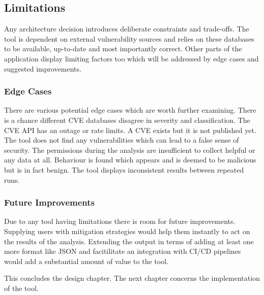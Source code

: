 \subsection{Limitations}

Any architecture decision introduces deliberate constraints and trade-offs. The tool is dependent on external vulnerability sources and relies on these databases to be available, up-to-date and most importantly correct. Other parts of the application display limiting factors too which will be addressed by edge cases and suggested improvements.

\subsubsection{Edge Cases}

There are various potential edge cases which are worth further examining. There is a chance different CVE databases disagree in severity and classification. The CVE API has an outage or rate limits. A CVE exists but it is not published yet. The tool does not find any vulnerabilities which can lead to a false sense of security. The permissions during the analysis are insufficient to collect helpful or any data at all.  Behaviour is found which appears and is deemed to be malicious but is in fact benign. The tool displays inconsistent results between repeated runs. 

\subsubsection{Future Improvements}

Due to any tool having limitations there is room for future improvements. Supplying users with mitigation strategies would help them instantly to act on the results of the analysis. Extending the output in terms of adding at least one more format like JSON and facitilitate an integration with CI/CD pipelines would add a substantial amount of value to the tool. \newline

This concludes the design chapter. The next chapter concerns the implementation of the tool.

